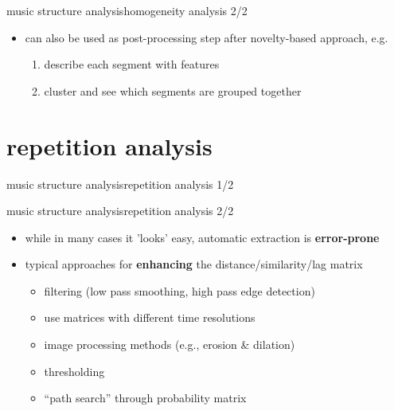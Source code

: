         \begin{frame}{music structure analysis}{homogeneity analysis 2/2}
            \begin{itemize}
                \item   can also be used as post-processing step after novelty-based approach, e.g.
                    \begin{enumerate}
                        \item   describe each segment with features
                        \item   cluster and see which segments are grouped together
                    \end{enumerate}
            \end{itemize}
        \end{frame}
        
    \section[repetition]{repetition analysis}%
        \begin{frame}{music structure analysis}{repetition analysis 1/2}
        \end{frame}
        \begin{frame}{music structure analysis}{repetition analysis 2/2}
            \begin{itemize}
                \item   while in many cases it 'looks' easy, automatic extraction is \textbf{error-prone}
                \bigskip
                \item<2->[$\Rightarrow$]   typical approaches for \textbf{enhancing} the distance/similarity/lag matrix
                    \begin{itemize}
                        \item   filtering (low pass smoothing, high pass edge detection)
                        \item   use matrices with different time resolutions
                        \item   image processing methods (e.g., erosion \& dilation)
                        \item   thresholding
                        \item   ``path search'' through probability matrix
                    \end{itemize}
            \end{itemize}
        \end{frame}
        
